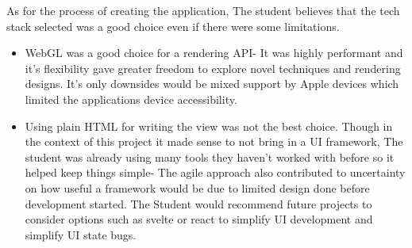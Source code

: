 As for the process of creating the application, The student believes that the tech stack selected was a good choice even if there were some limitations.
\begin{itemize}
    \item WebGL was a good choice for a rendering API- It was highly performant and it's flexibility gave greater freedom to explore novel techniques and rendering designs. It's only downsides would be mixed support by Apple devices \cite[]{apple_metal} which limited the applications device accessibility.
    \item Using plain HTML for writing the view was not the best choice. Though in the context of this project it made sense to not bring in a UI framework, The student was already using many tools they haven't worked with before so it helped keep things simple- The agile approach also contributed to uncertainty on how useful a framework would be due to limited design done before development started. The Student would recommend future projects to consider options such as svelte or react to simplify UI development and simplify UI state bugs.
\end{itemize}

